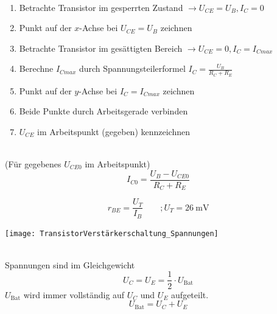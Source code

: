 \documentclass[a5paper, 12pt, twoside]{scrartcl}
\begin{document}
\\
\begin{enumerate}
\item Betrachte Transistor im gesperrten Zustand \(\rightarrow U_{CE} = U_B, I_C = 0\)
\item Punkt auf der \(x\)-Achse bei \(U_{CE} = U_B\) zeichnen
\item Betrachte Transistor im gesättigten Bereich \(\rightarrow U_{CE} = 0, I_C = I_{Cmax}\)
\item Berechne \(I_{Cmax}\) durch Spannungsteilerformel \(I_C = \frac{U_B}{R_C + R_E}\)
\item Punkt auf der \(y\)-Achse bei \(I_C = I_{Cmax}\) zeichnen
\item Beide Punkte durch Arbeitsgerade verbinden
\item \(U_{CE}\) im Arbeitspunkt (gegeben) kennzeichnen
\end{enumerate}

\\
(Für gegebenes \(U_{CE0}\) im Arbeitspunkt)
\[I_{C0} = \frac{U_B - U_{CE0}}{R_C + R_E}\]

\[r_{BE} = \frac{U_T}{I_B} \qquad; U_T = \SI{26}{\milli\volt}\]

{\centering
  \texttt{[image: TransistorVerstärkerschaltung\_Spannungen]}
  \par%
}


\\
Spannungen sind im Gleichgewicht
\[U_C = U_E = \frac{1}{2} \cdot U_{\text{Bat}}\]
\(U_{\text{Bat}}\) wird immer vollständig auf \(U_C\) und \(U_E\) aufgeteilt.
\[U_{\text{Bat}} = U_C + U_E\]
\end{document}
